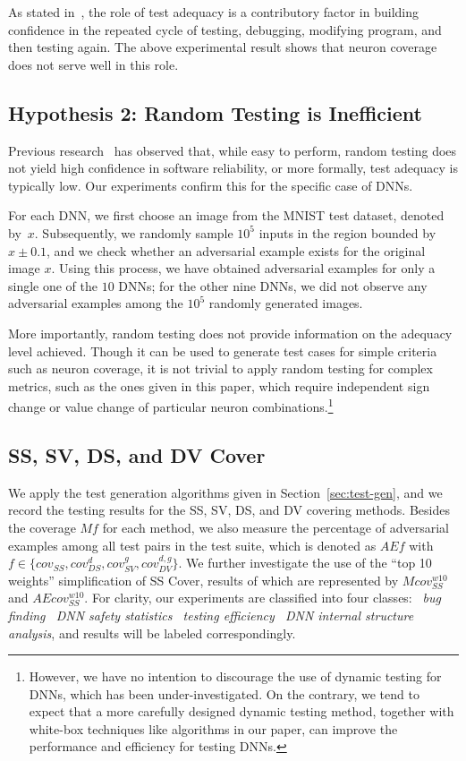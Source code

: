 \documentclass[runningheads,a4paper]{llncs}
\newcommand{\valuefunction}{g}
\newcommand{\covered}[3]{cov_{#1}^{#2}#3}
\begin{document}
As stated in~\cite{ZHM1997}, the role of test adequacy is a contributory
factor in building confidence in the repeated cycle of testing, debugging,
modifying program, and then testing again.  The above experimental result
shows that neuron coverage does not serve well in this role.

\subsection{Hypothesis 2: Random Testing is Inefficient}\label{sec:random}

Previous research~\cite{ZHM1997} has observed that, while easy to perform,
random testing does not yield high confidence in software reliability, or
more formally, test adequacy is typically low.
Our experiments confirm this for the specific case of DNNs.

For each DNN, we first choose an image from the MNIST test dataset, denoted
by~$x$.  Subsequently, we randomly sample $10^5$ inputs in the region
bounded by $x\pm 0.1$, and we check whether an adversarial example exists
for the original image $x$.  Using this process, we have obtained
adversarial examples for only a single one of the $10$ DNNs; for the other
nine DNNs, we did not observe any adversarial examples among the $10^5$
randomly generated images.

More importantly, random testing does not provide information on the
adequacy level achieved.  Though it can be used to generate test cases for
simple criteria such as neuron coverage, it is not trivial to apply random
testing for complex metrics, such as the ones given in this paper, which
require independent sign change or value change of particular neuron
combinations.\footnote{However, we have no intention to discourage the use of
dynamic testing for DNNs, which has been under-investigated.  On the
contrary, we tend to expect that a more carefully designed dynamic testing method,
together with white-box techniques like algorithms in our paper, can improve
the performance and efficiency for testing DNNs.}\subsection{SS, SV, DS, and DV Cover}

We apply the test generation algorithms given in Section~\ref{sec:test-gen},
and we record the testing results for the SS, SV, DS, and DV covering
methods.  Besides the coverage $Mf$ for each method, we also measure the
percentage of adversarial examples among all test pairs in the test suite,
which is denoted as $AEf$ with
$f\in\{\covered{SS}{}{},\covered{DS}{d}{},\covered{SV}{\valuefunction}{},\covered{DV}{d,\valuefunction}{}\}$.
We further investigate the use of the ``top 10 weights'' simplification of
SS Cover, results of which are represented by $M{cov_{SS}^{w10}}$ and
$AE{cov_{SS}^{w10}}$.  For clarity, our experiments are classified into four
classes: \emph{~bug finding ~DNN safety statistics
~testing efficiency ~DNN internal structure
analysis}, and results will be labeled correspondingly.
\end{document}
